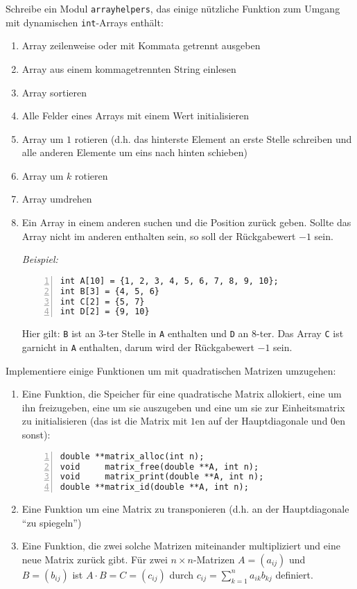 \documentclass{uebungszettel}
\begin{document}
\begin{aufg}
Schreibe ein Modul \verb|arrayhelpers|, das einige nützliche Funktion zum Umgang mit dynamischen \verb|int|-Arrays enthält:
\begin{enumerate}
\item Array zeilenweise oder mit Kommata getrennt ausgeben
\item Array aus einem kommagetrennten String einlesen
\item Array sortieren
\item Alle Felder eines Arrays mit einem Wert initialisieren
\item Array um $1$ rotieren (d.h. das hinterste Element an erste Stelle schreiben und alle anderen Elemente um eins nach hinten schieben)
\item Array um $k$ rotieren 
\item Array umdrehen
\item Ein Array in einem anderen suchen und die Position zurück geben. Sollte das Array nicht im anderen enthalten sein, so soll der Rückgabewert $-1$ sein.

\emph{Beispiel:} 
\begin{codelisting}
\begin{lstlisting}[numbers=left,numberstyle=\tiny,frame=tlrb]
int A[10] = {1, 2, 3, 4, 5, 6, 7, 8, 9, 10};
int B[3] = {4, 5, 6}
int C[2] = {5, 7}
int D[2] = {9, 10}
\end{lstlisting}
\end{codelisting}
Hier gilt: \verb|B| ist an $3$-ter Stelle in \verb|A| enthalten und \verb|D| an $8$-ter. Das Array \verb|C| ist garnicht in \verb|A| enthalten, darum wird der Rückgabewert $-1$ sein.
\end{enumerate}
\end{aufg}

\begin{aufg} Implementiere einige Funktionen um mit quadratischen Matrizen umzugehen:
\begin{enumerate}
\item Eine Funktion, die Speicher für eine quadratische Matrix allokiert, eine um ihn freizugeben, eine um sie auszugeben und eine um sie zur Einheitsmatrix zu initialisieren (das ist die Matrix mit $1$en auf der Hauptdiagonale und $0$en sonst):
\begin{codelisting}
\begin{lstlisting}[numbers=left,numberstyle=\tiny,frame=tlrb]
double **matrix_alloc(int n);
void     matrix_free(double **A, int n);
void     matrix_print(double **A, int n);
double **matrix_id(double **A, int n);
\end{lstlisting}
\end{codelisting}
\item Eine Funktion um eine Matrix zu transponieren (d.h. an der Hauptdiagonale ``zu spiegeln'')
\item Eine Funktion, die zwei solche Matrizen miteinander multipliziert und eine neue Matrix zurück gibt. Für zwei $n \times n$-Matrizen $A = (a_{ij})$ und $B = (b_{ij})$ ist $A \cdot B = C = (c_{ij})$ durch $c_{ij} = \sum_{k=1}^n a_{ik} b_{kj}$ definiert.
\end{enumerate}
\end{aufg}
\end{document}
